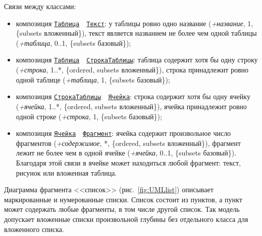 Связи между классами:
\begin{itemize}
	\item композиция \hyperref[fig:UMLtable]{\Verb|Таблица|}~~\hyperref[fig:UMLpic]{\Verb|Текст|}: у таблицы ровно одно название (\textit{+название}, 1, \{subsets вложенный\}), текст является названием не более чем одной таблицы (\textit{+таблица}, 0..1, \{subsets базовый\});
	\item композиция \hyperref[fig:UMLtable]{\Verb|Таблица|}~~\hyperref[fig:UMLtable]{\Verb|СтрокаТаблицы|}: таблица содержит хотя бы одну строку (\textit{+строка}, 1..*, \{ordered, subsets вложенный\}), строка принадлежит ровно одной таблице (\textit{+таблица}, 1, \{subsets базовый\});
	\item композиция \hyperref[fig:UMLtable]{\Verb|СтрокаТаблицы|}~~\hyperref[fig:UMLtable]{\Verb|Ячейка|}: строка содержит хотя бы одну ячейку (\textit{+ячейка}, 1..*, \{ordered, subsets вложенный\}), ячейка принадлежит ровно одной строке (\textit{+строка}, 1, \{subsets базовый\});
	\item композиция \hyperref[fig:UMLtable]{\Verb|Ячейка|}~~\hyperref[fig:UMLdoc]{\Verb|Фрагмент|}: ячейка содержит произвольное число фрагментов (\textit{+содержимое}, *, \{ordered, subsets вложенный\}), фрагмент лежит не более чем в одной ячейке (\textit{+ячейка}, 0..1, \{subsets базовый\}). Благодаря этой связи в ячейке может находиться любой фрагмент: текст, рисунок или вложенная таблица.
\end{itemize}

Диаграмма фрагмента <<список>> (рис.~\ref{fig:UMLlist}) описывает маркированные и нумерованные списки. Список состоит из пунктов, а пункт может содержать любые фрагменты, в том числе другой список. Так модель допускает вложенные списки произвольной глубины без отдельного класса для вложенного списка.

